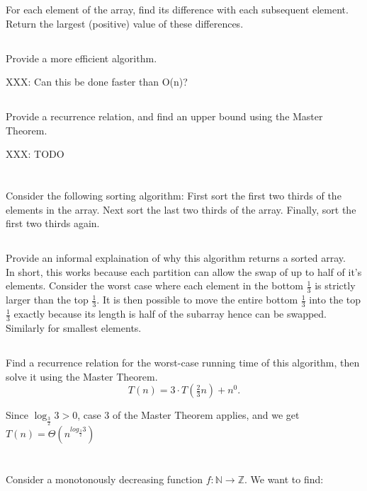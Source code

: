 \documentclass{amsart}
\theoremstyle{definition}
\theoremstyle{remark}
\numberwithin{equation}{section}
\newcommand{\NN}{\mathbb N}
\newcommand{\ZZ}{\mathbb Z}
\begin{document}
For each element of the array, find its difference with each subsequent element. Return the largest (positive) value of these differences.

\subsection{} Provide a more efficient algorithm.

XXX: Can this be done faster than O(n)?

\subsection{} Provide a recurrence relation, and find an upper bound
using the Master Theorem.

XXX: TODO

\section{} Consider the following sorting algorithm: First sort the
first two thirds of the elements in the array. Next sort the last two
thirds of the array. Finally, sort the first two thirds again.

\subsection{} Provide an informal explaination of why this algorithm returns a
sorted array. \\

In short, this works because each partition can allow the swap of up to half of it's elements. Consider the worst case where each element in the bottom $\frac{1}{3}$ is strictly larger than the top $\frac{1}{3}$. It is then possible to move the entire bottom $\frac{1}{3}$ into the top $\frac{1}{3}$ exactly because its length is half of the subarray hence can be swapped. Similarly for smallest elements.

\subsection{} Find a recurrence relation for the worst-case running time of this algorithm, then solve it using the Master Theorem.
$$ T(n) = 3 \cdot T( \tfrac{2}{3} n) + n^0. $$

Since $\log_{\frac{3}{2}} {3} > 0$, case 3 of the Master Theorem applies, and we get
$T(n) = \Theta ( n^{log_{\frac{3}{2}} {3}} )$


\section{} Consider a monotonously decreasing function $f : \NN \rightarrow \ZZ$. We want to find:
\end{document}
